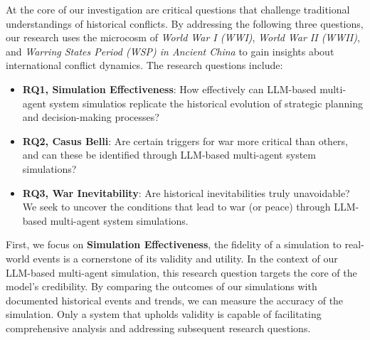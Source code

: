 \documentclass{article}
\begin{document}
\par At the core of our investigation are critical questions that challenge traditional understandings of historical conflicts. By addressing the following three questions, our research uses the microcosm of \textit{World War I (WWI)}, \textit{World War II (WWII)}, and \textit{Warring States Period (WSP) in Ancient China} to gain insights about international conflict dynamics. The research questions include:
\begin{itemize}
    \item \textbf{RQ1, Simulation Effectiveness}: How effectively can LLM-based multi-agent system simulatios replicate the historical evolution of strategic planning and decision-making processes?
    \item \textbf{RQ2, Casus Belli}: Are certain triggers for war more critical than others, and can these be identified through LLM-based multi-agent system simulations?
    \item \textbf{RQ3, War Inevitability}: Are historical inevitabilities truly unavoidable? We seek to uncover the conditions that lead to war (or peace) through LLM-based multi-agent system simulations.
\end{itemize}

\par First, we focus on \textbf{Simulation Effectiveness}, the fidelity of a simulation to real-world events is a cornerstone of its validity and utility. In the context of our LLM-based multi-agent simulation, this research question targets the core of the model's credibility. By comparing the outcomes of our simulations with documented historical events and trends, we can measure the accuracy of the simulation. Only a system that upholds validity is capable of facilitating comprehensive analysis and addressing subsequent research questions.
\end{document}
